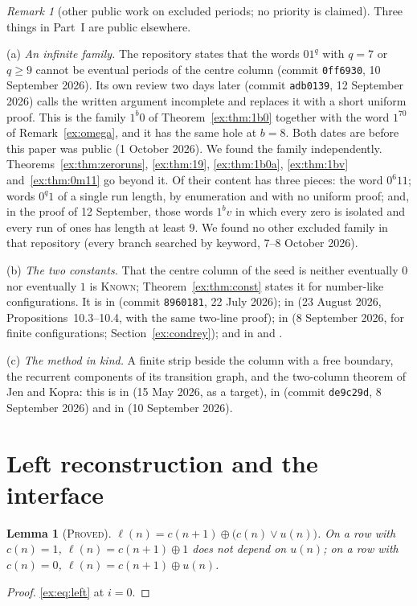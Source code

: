 \documentclass[11pt]{article}
\newtheorem{lemma}[theorem]{Lemma}
\theoremstyle{definition}
\theoremstyle{remark}
\newtheorem{remark}[theorem]{Remark}
\newcommand{\PROVED}{\textsc{Proved}}
\newcommand{\KNOWN}{\textsc{Known}}
\begin{document}
\begin{remark}[other public work on excluded periods; no priority is claimed]\label{ex:prior}
Three things in Part~I are public elsewhere.

(a) \emph{An infinite family.} The repository \cite{Cochon} states that the words $01^{q}$ with $q=7$ or $q\ge9$ cannot be eventual periods of the centre column (commit \texttt{0ff6930}, 10 September 2026). Its own review two days later (commit \texttt{adb0139}, 12 September 2026) calls the written argument incomplete and replaces it with a short uniform proof. This is the family $1^b0$ of Theorem~\ref{ex:thm:1b0} together with the word $1^70$ of Remark~\ref{ex:omega}, and it has the same hole at $b=8$. Both dates are before this paper was public (1 October 2026). We found the family independently. Theorems~\ref{ex:thm:zeroruns}, \ref{ex:thm:19}, \ref{ex:thm:1b0a}, \ref{ex:thm:1bv} and~\ref{ex:thm:0m11} go beyond it. Of their content \cite{Cochon} has three pieces: the word $0^{6}11$; words $0^{q}1$ of a single run length, by enumeration and with no uniform proof; and, in the proof of 12 September, those words $1^bv$ in which every zero is isolated and every run of ones has length at least $9$. We found no other excluded family in that repository (every branch searched by keyword, 7--8 October 2026).

(b) \emph{The two constants.} That the centre column of the seed is neither eventually $0$ nor eventually $1$ is \KNOWN; Theorem~\ref{ex:thm:const} states it for number-like configurations. It is in \cite{WRyan} (commit \texttt{8960181}, 22 July 2026); in \cite{Woffinden} (23 August 2026, Propositions~10.3--10.4, with the same two-line proof); in \cite{Condrey} (8 September 2026, for finite configurations; Section~\ref{ex:condrey}); and in \cite{Cochon} and \cite{Dib}.

(c) \emph{The method in kind.} A finite strip beside the column with a free boundary, the recurrent components of its transition graph, and the two-column theorem of Jen and Kopra: this is in \cite{Ikram} (15 May 2026, as a target), in \cite{Pat} (commit \texttt{de9c29d}, 8 September 2026) and in \cite{Cochon} (10 September 2026).
\end{remark}

\section{Left reconstruction and the interface}

\begin{lemma}[\PROVED]\label{ex:lem:left}
$\ell(n)=c(n+1)\oplus\bigl(c(n)\vee u(n)\bigr)$. On a row with $c(n)=1$, $\ell(n)=c(n+1)\oplus1$ does not depend on $u(n)$; on a row with $c(n)=0$, $\ell(n)=c(n+1)\oplus u(n)$.
\end{lemma}
\begin{proof}
\eqref{ex:eq:left} at $i=0$.
\end{proof}
\end{document}
